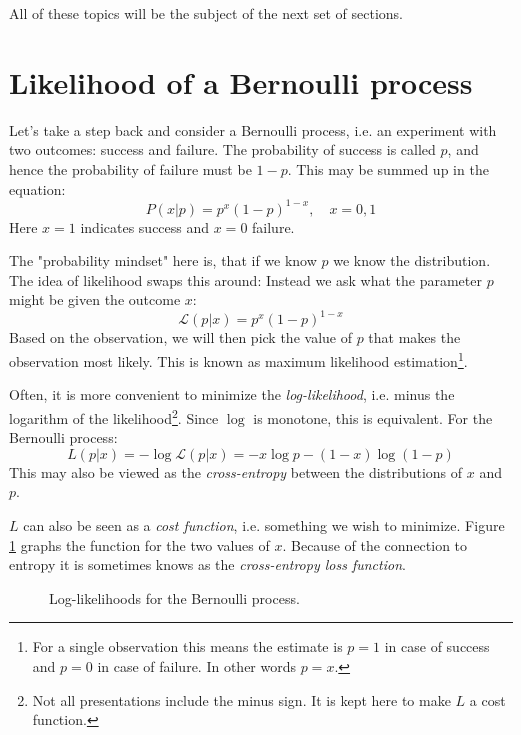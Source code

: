 \documentclass[12pt, a4paper]{article}
\numberwithin{equation}{section}
\begin{document}
All of these topics will be the subject of the next set of sections.

\section{Likelihood of a Bernoulli process}
Let's take a step back and consider a Bernoulli process, i.e. an experiment with two outcomes: success and failure. The probability of success is called $p$, and hence the probability of failure must be $1-p$. This may be summed up in the equation:
\begin{equation}
P(x|p)=p^x(1-p)^{1-x},\quad x=0,1
\end{equation}
Here $x=1$ indicates success and $x=0$ failure.

The "probability mindset" here is, that if we know $p$ we know the distribution. The idea of likelihood swaps this around: Instead we ask what the parameter $p$ might be given the outcome $x$:
\begin{equation}
\mathcal{L}(p|x)=p^x(1-p)^{1-x}
\end{equation}
Based on the observation, we will then pick the value of $p$ that makes the observation most likely. This is known as maximum likelihood estimation\footnote{For a single observation this means the estimate is $p=1$ in case of success and $p=0$ in case of failure. In other words $p=x$.}.

Often, it is more convenient to minimize the \textit{log-likelihood}, i.e. minus the logarithm of the likelihood\footnote{Not all presentations include the minus sign. It is kept here to make $L$ a cost function.}. Since $\log$ is monotone, this is equivalent. For the Bernoulli process:
\begin{equation}
L(p|x)=-\log\mathcal{L}(p|x)=-x\log p-(1-x)\log(1-p)
\end{equation}
This may also be viewed as the \textit{cross-entropy} between the distributions of $x$ and $p$.

$L$ can also be seen as a \textit{cost function}, i.e. something we wish to minimize. Figure \ref{fig:bernoulli} graphs the function for the two values of $x$. Because of the connection to entropy it is sometimes knows as the \textit{cross-entropy loss function}.

\begin{figure}
\centering
{}
\caption{Log-likelihoods for the Bernoulli process.}
\label{fig:bernoulli}
\end{figure}
\end{document}

